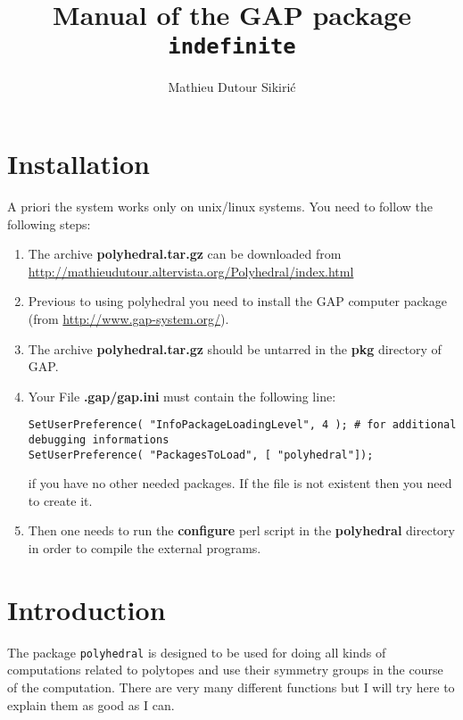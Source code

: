 \documentclass[12pt]{amsart}
\begin{document}
\author{Mathieu Dutour Sikiri\'c}
\address{Mathieu Dutour Sikiri\'c, Rudjer Boskovi\'c Institute, Bijenicka 54, 10000 Zagreb, Croatia}


\title{Manual of the GAP package {\tt indefinite}}
\date{}

\maketitle
\tableofcontents

\section{Installation}

A priori the system works only on unix/linux systems.
You need to follow the following steps:
\begin{enumerate}
\item The archive {\bf polyhedral.tar.gz} can be downloaded from
\url{http://mathieudutour.altervista.org/Polyhedral/index.html}

\item Previous to using polyhedral you need to install the GAP computer package (from \url{http://www.gap-system.org/}).

\item The archive {\bf polyhedral.tar.gz} should be untarred in the {\bf pkg} directory of GAP.

\item Your File {\bf .gap/gap.ini} must contain the following line:
\begin{verbatim}
SetUserPreference( "InfoPackageLoadingLevel", 4 ); # for additional debugging informations
SetUserPreference( "PackagesToLoad", [ "polyhedral"]);
\end{verbatim}
if you have no other needed packages. If the file is not existent then you need to create it.

\item Then one needs to run the {\bf configure} perl script in the {\bf polyhedral} directory in order to compile the external programs.
\end{enumerate}


\section{Introduction}
The package {\tt polyhedral} is designed to be used for doing all kinds
of computations related to polytopes and use their symmetry groups in
the course of the computation.
There are very many different functions but I will try here to explain
them as good as I can.
\end{document}
